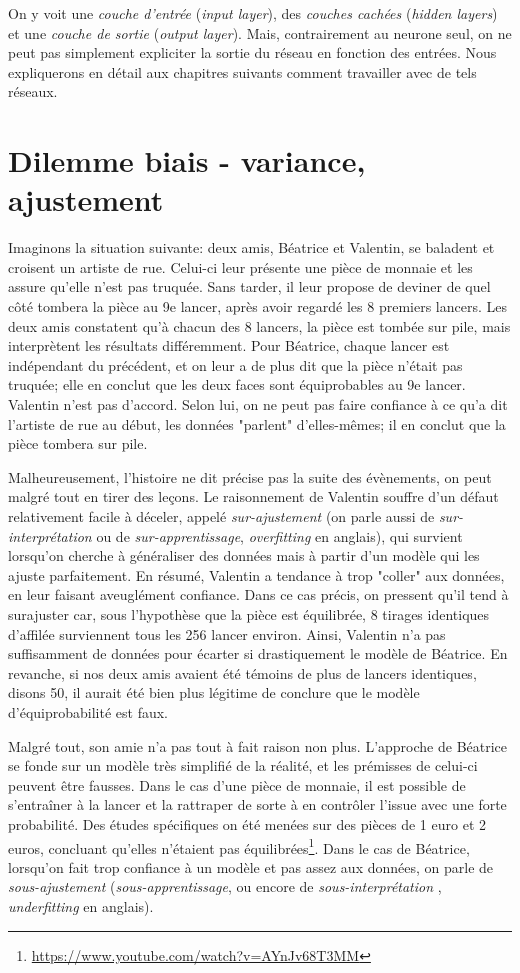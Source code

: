 On y voit une \emph{couche d'entrée} (\emph{input layer}), des \emph{couches cachées} (\emph{hidden layers}) et une \emph{couche de sortie} (\emph{output layer}). Mais, contrairement au neurone seul, on ne peut pas simplement expliciter la sortie du réseau en fonction des entrées. Nous expliquerons en détail aux chapitres suivants comment travailler avec de tels réseaux.


\section{Dilemme biais - variance, ajustement}
Imaginons la situation suivante: deux amis, Béatrice et Valentin, se baladent et croisent un artiste de rue. Celui-ci leur présente une pièce de monnaie et les assure qu'elle n'est pas truquée. Sans tarder, il leur propose de deviner de quel côté tombera la pièce au 9e lancer,  après avoir regardé les 8 premiers lancers. Les deux amis constatent qu'à chacun des 8 lancers, la pièce est tombée sur pile, mais interprètent les résultats différemment. Pour Béatrice, chaque lancer est indépendant du précédent, et on leur a de plus dit que la pièce n'était pas truquée; elle en conclut que les deux faces sont équiprobables au 9e lancer. Valentin n'est pas d'accord. Selon lui, on ne peut pas faire confiance à ce qu'a dit l'artiste de rue au début, les données "parlent" d'elles-mêmes; il en conclut que la pièce tombera sur pile.

Malheureusement, l'histoire ne dit précise pas la suite des évènements, on peut malgré tout en tirer des leçons. Le raisonnement de Valentin souffre d'un défaut relativement facile à déceler, appelé \emph{sur-ajustement} (on parle aussi de \emph{sur-interprétation} ou de \emph{sur-apprentissage}, \emph{overfitting} en anglais), qui survient lorsqu'on cherche à généraliser des données mais à partir d'un modèle qui les ajuste parfaitement. En résumé, Valentin a tendance à trop "coller" aux données, en leur faisant aveuglément confiance. Dans ce cas précis, on pressent qu'il tend à surajuster car, sous l'hypothèse que la pièce est équilibrée, 8 tirages identiques d'affilée surviennent tous les 256 lancer environ. Ainsi, Valentin n'a pas suffisamment de données pour écarter si drastiquement le modèle de Béatrice. En revanche, si nos deux amis avaient été témoins de plus de lancers identiques, disons 50, il aurait été bien plus légitime de conclure que le modèle d'équiprobabilité est faux.

Malgré tout, son amie n'a pas tout à fait raison non plus. L'approche de Béatrice se fonde sur un modèle très simplifié de la réalité, et les prémisses de celui-ci peuvent être fausses. Dans le cas d'une pièce de monnaie, il est possible de s'entraîner à la lancer et la rattraper de sorte à en contrôler l'issue avec une forte probabilité. Des études spécifiques on été menées sur des pièces de 1 euro et 2 euros, concluant qu'elles n'étaient pas équilibrées\footnote{\url{https://www.youtube.com/watch?v=AYnJv68T3MM}}. Dans le cas de Béatrice, lorsqu'on fait trop confiance à un modèle et pas assez aux données, on parle de \emph{sous-ajustement} (\emph{sous-apprentissage}, ou encore de \emph{sous-interprétation} , \emph{underfitting} en anglais).

